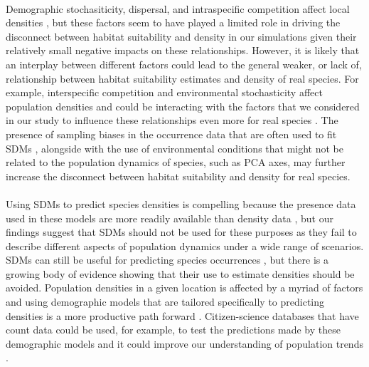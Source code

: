 \paragraph*{}
Demographic stochasiticity, dispersal, and intraspecific competition affect local densities \parencite{melbourne2008,furrer2016, zhang2021}, but these factors seem to have played a limited role in driving the disconnect between habitat suitability and density in our simulations given their relatively small negative impacts on these relationships. However, it is likely that an interplay between different factors could lead to the general weaker, or lack of, relationship between habitat suitability estimates and density of real species. For example, interspecific competition and environmental stochasticity affect population densities \parencite{may1973, robertson1996} and could be interacting with the factors that we considered in our study to influence these relationships even more for real species \parencite{santini2019, braz2020}. The presence of sampling biases in the occurrence data that are often used to fit SDMs \parencite{inman2021,bowler2023}, alongside with the use of environmental conditions that might not be related to the population dynamics of species, such as PCA axes, may further increase the disconnect between habitat suitability and density for real species. 


\paragraph*{}
Using SDMs to predict species densities is compelling because the presence data used in these models are more readily available than density data \parencite{pearce2006, bradley2016, hortal2015}, but our findings suggest that SDMs should not be used for these purposes as they fail to describe different aspects of population dynamics under a wide range of scenarios. SDMs can still be useful for predicting species occurrences \parencite{lee2022}, but there is a growing body of evidence showing that their use to estimate densities should be avoided. Population densities in a given location is affected by a myriad of factors and using demographic models that are tailored specifically to predicting densities is a more productive path forward \parencite{dallas2018, lee2022}. Citizen-science databases that have count data could be used, for example, to test the predictions made by these demographic models and it could improve our understanding of population trends \parencite{dennis2017, fink2020}. 

